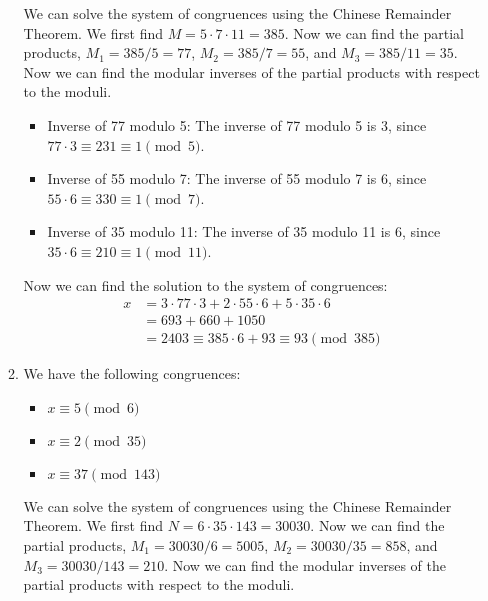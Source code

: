 \documentclass[a4paper]{article}
\begin{document}
\begin{enumerate}
\begin{enumerate}
            We can solve the system of congruences using the Chinese Remainder Theorem. We first find $M = 5 \cdot 7 \cdot 11 = 385$. Now we can find the partial products, $M_1 = 385/5 = 77$, $M_2 = 385/7 = 55$, and $M_3 = 385/11 = 35$. Now we can find the modular inverses of the partial products with respect to the moduli.\\

            \begin{itemize}
                \item Inverse of 77 modulo 5: The inverse of 77 modulo 5 is 3, since \(77 \cdot 3 \equiv 231 \equiv 1 \pmod{5}\).
                \item Inverse of 55 modulo 7: The inverse of 55 modulo 7 is 6, since \(55 \cdot 6 \equiv 330 \equiv 1 \pmod{7}\).
                \item Inverse of 35 modulo 11: The inverse of 35 modulo 11 is 6, since \(35 \cdot 6 \equiv 210 \equiv 1 \pmod{11}\).
            \end{itemize}

            Now we can find the solution to the system of congruences:
            \[
                \begin{split}
                    x &= 3 \cdot 77 \cdot 3 + 2 \cdot 55 \cdot 6 + 5 \cdot 35 \cdot 6 \\
                    &= 693 + 660 + 1050 \\
                    &= 2403 \equiv 385 \cdot 6 + 93 \equiv 93 \pmod{385}
                \end{split}
            \]

            \item We have the following congruences:
            \begin{itemize}
                \item \(x \equiv 5 \pmod{6}\)
                \item \(x \equiv 2 \pmod{35}\)
                \item \(x \equiv 37 \pmod{143}\)
            \end{itemize}

            We can solve the system of congruences using the Chinese Remainder Theorem. We first find $N = 6 \cdot 35 \cdot 143 = 30030$. Now we can find the partial products, $M_1 = 30030/6 = 5005$, $M_2 = 30030/35 = 858$, and $M_3 = 30030/143 = 210$. Now we can find the modular inverses of the partial products with respect to the moduli.\\


\end{enumerate}
\end{enumerate}
\end{document}
